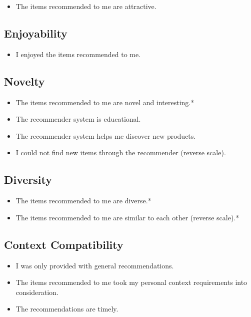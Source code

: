 \begin{itemize}
\item The items recommended to me are attractive.
\end{itemize}

\subsection{Enjoyability}

\begin{itemize}
\item I enjoyed the items recommended to me.
\end{itemize}

\subsection{Novelty}

\begin{itemize}
\item The items recommended to me are novel and interesting.*
\item The recommender system is educational.
\item The recommender system helps me discover new products.
\item I could not find new items through the recommender (reverse scale).
\end{itemize}

\subsection{Diversity}

\begin{itemize}
\item The items recommended to me are diverse.*
\item The items recommended to me are similar to each other (reverse scale).*
\end{itemize}

\subsection{Context Compatibility}

\begin{itemize}
\item I was only provided with general recommendations.
\item The items recommended to me took my personal context requirements into consideration.
\item The recommendations are timely.
\end{itemize}


